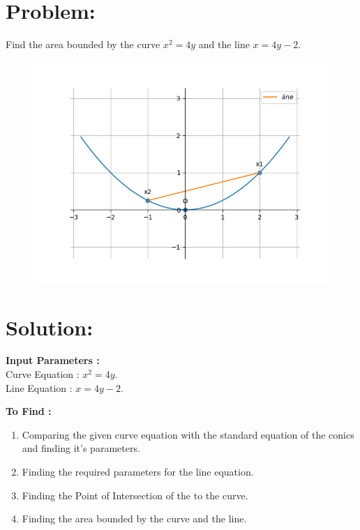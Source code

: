 \documentclass[10pt,a4paper]{report}
\begin{document}
\begin{multicols}{2}

\section{Problem:}  
\fi
Find the area bounded by the curve $x^2=4y$ and the line $x=4y-2$.
\\
\solution 
	\begin{figure}[!h]
		\centering
 \includegraphics[width=\columnwidth]{chapters/12/8/1/10/figs/conic.png}
		\caption{}
		\label{fig:12/8/1/10}
  	\end{figure}
\iffalse

\section{Solution: }
\raggedright \textbf{Input Parameters :}\\ \vspace{2mm}
\centering Curve Equation : $x^2=4y$. \\ \vspace{1mm}
Line Equation : $x=4y-2$.\\
\vspace{3mm}

\raggedright \textbf{To Find :}\\ \vspace{2mm}
\begin{enumerate}
\item Comparing the given curve equation with the standard equation of the conics and finding it's parameters.
\item Finding the required parameters for the line equation.
\item Finding the Point of Intersection of the to the curve.
\item Finding the area bounded by the curve and the line.
\end{enumerate}


\end{multicols}
\end{document}
